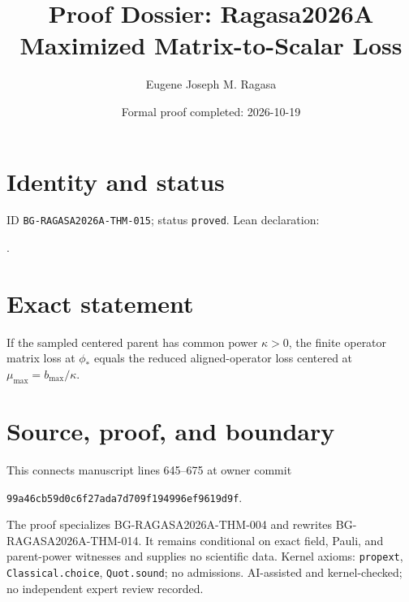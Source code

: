 \documentclass[11pt]{article}
\title{Proof Dossier: Ragasa2026A Maximized Matrix-to-Scalar Loss}\author{Eugene Joseph M. Ragasa}\date{Formal proof completed: 2026-10-19}
\begin{document}
\maketitle
\section{Identity and status}
ID \texttt{BG-RAGASA2026A-THM-015}; status \texttt{proved}. Lean declaration:
\par{}.
\section{Exact statement}
If the sampled centered parent has common power $\kappa>0$, the finite operator matrix
loss at $\phi_*$ equals the reduced aligned-operator loss centered at
$\mu_{\max}=b_{\max}/\kappa$.
\section{Source, proof, and boundary}
This connects manuscript lines 645--675 at owner commit
\begin{center}\small\texttt{99a46cb59d0c6f27ada7d709f194996ef9619d9f}.\end{center}
The proof specializes BG-RAGASA2026A-THM-004 and rewrites
BG-RAGASA2026A-THM-014. It remains conditional on exact field, Pauli, and parent-power
witnesses and supplies no scientific data. Kernel axioms: \texttt{propext},
\texttt{Classical.choice}, \texttt{Quot.sound}; no admissions. AI-assisted and
kernel-checked; no independent expert review recorded.
\end{document}
